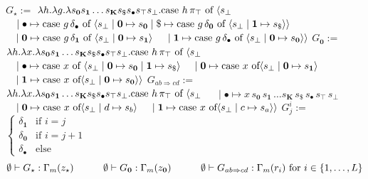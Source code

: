     $\displaystyle G_{\star}:=$ $\displaystyle\lambda h.\lambda g.\lambda s_{\mathbf{0}}s_{\mathbf{1}}\ldots s_%
{\mathbf{K}}s_{\$}s_{\bullet}s_{\top}s_{\bot}.\textnormal{{case }}h\,\pi_{\top%
}\textnormal{{ of }}\langle s_{\bot}$      $\displaystyle\hskip 10.00002pt\mid\bullet\mapsto\textnormal{{case }}{g\,\delta%
_{\bullet}}\textnormal{{ of }}\langle s_{\bot}\mid\mathbf{0}\mapsto s_{\mathbf%
{0}}\mid\$\mapsto\textnormal{{case }}{g\,\delta_{\mathbf{0}}}\textnormal{{ of %
}}\langle s_{\bot}\mid\mathbf{1}\mapsto s_{\$}\rangle\rangle$      $\displaystyle\hskip 10.00002pt\mid\mathbf{0}\mapsto\textnormal{{case }}{g\,%
\delta_{\mathbf{1}}}\textnormal{{ of }}\langle s_{\bot}\mid\mathbf{0}\mapsto s%
_{\mathbf{1}}\rangle$      $\displaystyle\hskip 10.00002pt\mid\mathbf{1}\mapsto\textnormal{{case }}{g\,%
\delta_{\bullet}}\textnormal{{ of }}\langle s_{\bot}\mid\mathbf{0}\mapsto s_{%
\mathbf{0}}\rangle\rangle$     $\displaystyle G_{\mathbf{0}}:=$ $\displaystyle\lambda h.\lambda x.\lambda s_{\mathbf{0}}s_{\mathbf{1}}\ldots s_%
{\mathbf{K}}s_{\$}s_{\bullet}s_{\top}s_{\bot}.\textnormal{{case }}h\,\pi_{\top%
}\textnormal{{ of }}\langle s_{\bot}$      $\displaystyle\quad\mid\bullet\mapsto\textnormal{{case }}{x}\textnormal{{ of }}%
\langle s_{\bot}\mid\mathbf{0}\mapsto s_{\mathbf{0}}\mid\mathbf{1}\mapsto s_{%
\$}\rangle$      $\displaystyle\quad\mid\mathbf{0}\mapsto\textnormal{{case }}{x}\textnormal{{ of%
 }}\langle s_{\bot}\mid\mathbf{0}\mapsto s_{\mathbf{1}}\rangle$      $\displaystyle\quad\mid\mathbf{1}\mapsto\textnormal{{case }}{x}\textnormal{{ of%
 }}\langle s_{\bot}\mid\mathbf{0}\mapsto s_{\mathbf{0}}\rangle\rangle$     $\displaystyle G_{ab\Rightarrow cd}:=$ $\displaystyle\lambda h.\lambda x.\lambda s_{\mathbf{0}}s_{\mathbf{1}}\ldots s_%
{\mathbf{K}}s_{\$}s_{\bullet}s_{\top}s_{\bot}.\textnormal{{case }}h\,\pi_{\top%
}\textnormal{{ of }}\langle s_{\bot}$      $\displaystyle\quad\mid\bullet\mapsto x\,s_{\mathbf{0}}\,s_{\mathbf{1}}\,\ldots
s%
_{\mathbf{K}}\,s_{\$}\,s_{\bullet}\,s_{\top}\,s_{\bot}$      $\displaystyle\quad\mid\mathbf{0}\mapsto\textnormal{{case }}{x}\textnormal{{ of%
 }}\langle s_{\bot}\mid d\mapsto s_{b}\rangle$      $\displaystyle\quad\mid\mathbf{1}\mapsto\textnormal{{case }}{x}\textnormal{{ of%
 }}\langle s_{\bot}\mid c\mapsto s_{a}\rangle\rangle$     $\displaystyle G_{j}^{i}:=$ $\displaystyle\begin{cases}\delta_{\mathbf{1}}&\text{if }i=j\\
\delta_{\mathbf{0}}&\text{if }i=j+1\\
\delta_{\bullet}&\text{else}\end{cases}$       \[\emptyset\vdash G_{\star}:\Gamma_{m}(z_{\star})\qquad\quad\emptyset\vdash G_{%
\mathbf{0}}:\Gamma_{m}(z_{\mathbf{0}})\qquad\quad\emptyset\vdash G_{ab%
\Rightarrow cd}:\Gamma_{m}(r_{i})\text{ for }i\in\{1,\ldots,L\}\]    
 
